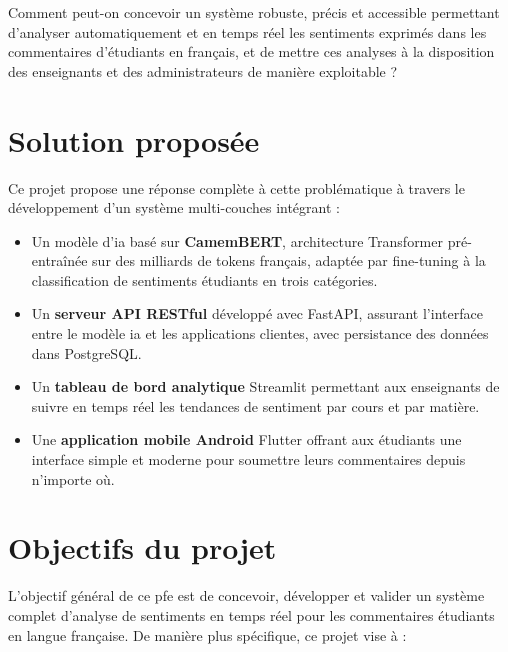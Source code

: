 Comment peut-on concevoir un système robuste, précis et accessible permettant
d'analyser automatiquement et en temps réel les sentiments exprimés dans les
commentaires d'étudiants en français, et de mettre ces analyses à la
disposition des enseignants et des administrateurs de manière exploitable ?

\section*{Solution proposée}

Ce projet propose une réponse complète à cette problématique à travers
le développement d'un système multi-couches intégrant :

\begin{itemize}[leftmargin=2em]
  \item[\textcolor{bleuprincipal}{\ding{118}}]
    Un modèle d'\acrfull{ia} basé sur \textbf{CamemBERT}, architecture
    Transformer pré-entraînée sur des milliards de tokens français, adaptée
    par fine-tuning à la classification de sentiments étudiants en trois
    catégories.

  \item[\textcolor{vertprincipal}{\ding{118}}]
    Un \textbf{serveur API RESTful} développé avec FastAPI, assurant
    l'interface entre le modèle \acrshort{ia} et les applications
    clientes, avec persistance des données dans PostgreSQL.

  \item[\textcolor{orangeaccent}{\ding{118}}]
    Un \textbf{tableau de bord analytique} Streamlit permettant aux
    enseignants de suivre en temps réel les tendances de sentiment par
    cours et par matière.

  \item[\textcolor{rougeprincipal}{\ding{118}}]
    Une \textbf{application mobile Android} Flutter offrant aux étudiants
    une interface simple et moderne pour soumettre leurs commentaires depuis
    n'importe où.
\end{itemize}

\section*{Objectifs du projet}

L'objectif général de ce \acrfull{pfe} est de concevoir, développer et
valider un système complet d'analyse de sentiments en temps réel pour les
commentaires étudiants en langue française. De manière plus spécifique,
ce projet vise à :

